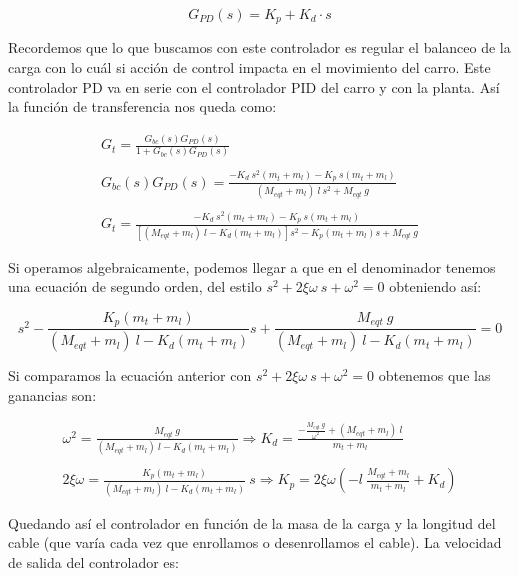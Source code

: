 \documentclass[11pt]{article}
\begin{document}
\begin{equation}
	\label{eq:controlador_PD}
	G_{PD}(s)=K_p+K_d\cdot s
\end{equation}

Recordemos que lo que buscamos con este controlador es regular el balanceo de la carga con lo cuál si acción de control impacta en el movimiento del carro. Este controlador PD va en serie con el controlador PID del carro y con la planta. Así la función de transferencia nos queda como:

\begin{equation}
	\label{eq:funcion_transferencia_controlador}
	\begin{matrix}G_t=\frac{G_{bc}(s)G_{PD}(s)}{1+G_{bc}(s)G_{PD}(s)}\\\\G_{bc}(s)G_{PD}(s)=\frac{-K_d\:s^{2}(m_t+m_l)-K_p\:s(m_t+m_l)}{(M_{eqt}+m_l)\:l\:s^{2}+M_{eqt}\:g}\\ \\G_t=\frac{-K_d\:s^{2}(m_t+m_l)-K_p\:s(m_t+m_l)}{\left [ (M_{eqt}+m_l)\:l-K_d(m_t+m_l) \right ]s^{2}-K_p(m_t+m_l)s+M_{eqt}\:g}\end{matrix}
\end{equation}

Si operamos algebraicamente, podemos llegar a que en el denominador tenemos una ecuación de segundo orden, del estilo $s^2+2\xi\omega\ s+\omega^2=0$ obteniendo así:

\begin{equation}
	\label{eq:funcion_transferencia_controlador_2}
	s^2-\frac{K_p(m_t+m_l)}{(M_{eqt}+m_l)\ l-K_d(m_t+m_l)}s+\frac{M_{eqt}\ g}{(M_{eqt}+m_l)\ l-K_d(m_t+m_l)}=0
\end{equation}

Si comparamos la ecuación anterior con $s^2+2\xi\omega\ s+\omega^2=0$ obtenemos que las ganancias son:

\begin{equation}
	\label{eq:ganancias}
	\begin{matrix}\omega ^{2}=\frac{M_{eqt}\:g}{(M_{eqt}+m_l)\:l-K_d(m_t+m_l)}\Rightarrow K_d=\frac{-\frac{M_{eqt}\:g}{\omega^{2}}+(M_{eqt}+m_l)\:l}{m_t+m_l}\\ \\2\xi \omega =\frac{K_p(m_t+m_l)}{(M_{eqt}+m_l)\:l-K_d(m_t+m_l)}\:s\Rightarrow K_p=2\xi \omega\left ( -l\:\frac{M_{eqt}+m_l}{m_t+m_l}+K_d \right )\end{matrix}
\end{equation}

Quedando así el controlador en función de la masa de la carga y la longitud del cable (que varía cada vez que enrollamos o desenrollamos el cable). La velocidad de salida del controlador es:
\end{document}

